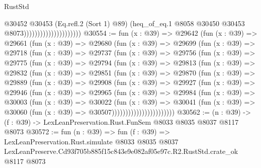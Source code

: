 \begin{lexlean}{RustStd}
\begin{coremodule}
                                          @30452
                                            @30453
                                            (Eq.refl.{2} (Sort 1) @89)
                                            (heq_of_eq.{1}
                                              @8058
                                              @30450
                                              @30453
                                              @8073)))))))))))))))))))))
@30554 := fun (x : @39) =>
  @29642
    (fun (x : @39) =>
    @29661
      (fun (x : @39) =>
      @29680
        (fun (x : @39) =>
        @29699
          (fun (x : @39) =>
          @29718
            (fun (x : @39) =>
            @29737
              (fun (x : @39) =>
              @29756
                (fun (x : @39) =>
                @29775
                  (fun (x : @39) =>
                  @29794
                    (fun (x : @39) =>
                    @29813
                      (fun (x : @39) =>
                      @29832
                        (fun (x : @39) =>
                        @29851
                          (fun (x : @39) =>
                          @29870
                            (fun (x : @39) =>
                            @29889
                              (fun (x : @39) =>
                              @29908
                                (fun (x : @39) =>
                                @29927
                                  (fun (x : @39) =>
                                  @29946
                                    (fun (x : @39) =>
                                    @29965
                                      (fun (x : @39) =>
                                      @29984
                                        (fun (x : @39) =>
                                        @30003
                                          (fun (x : @39) =>
                                          @30022
                                            (fun (x : @39) =>
                                            @30041
                                              (fun (x : @39) =>
                                              @30060 (fun (x : @39) => @30507)))))))))))))))))))))))
@30562 := (n : @39) -> (f : @39) -> LexLeanPreservation.Rust.FunSem @8033 @8035 @8037 @8117 @8073
@30572 := fun (n : @39) =>
  fun (f : @39) =>
  LexLeanPreservation.Rust.simulate
    @8033
    @8035
    @8037
    LexLeanPreserve.Cd93f705b885f15c843e9e082af05e97c.R2.RustStd.crate_ok
    @8117
    @8073
\end{coremodule}
\end{lexlean}
